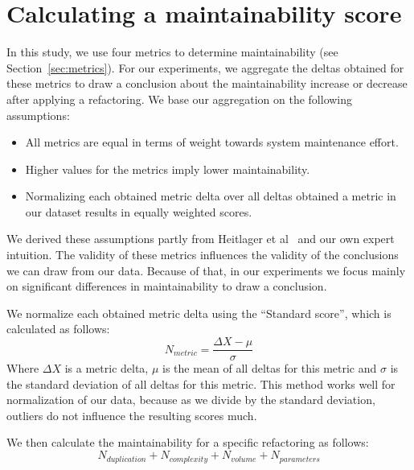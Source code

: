 \section{Calculating a maintainability score}\label{sec:metricformula}
In this study, we use four metrics to determine maintainability (see Section~\ref{sec:metrics}). For our experiments, we aggregate the deltas obtained for these metrics to draw a conclusion about the maintainability increase or decrease after applying a refactoring. We base our aggregation on the following assumptions:
\begin{itemize}
  \item All metrics are equal in terms of weight towards system maintenance effort.
  \item Higher values for the metrics imply lower maintainability. %
  \item Normalizing each obtained metric delta over all deltas obtained a metric in our dataset results in equally weighted scores. %
\end{itemize}
We derived these assumptions partly from Heitlager et al~\cite{heitlager2007practical} and our own expert intuition. The validity of these metrics influences the validity of the conclusions we can draw from our data. Because of that, in our experiments we focus mainly on significant differences in maintainability to draw a conclusion. %

We normalize each obtained metric delta using the ``Standard score'', which is calculated as follows:
\begin{equation}\label{eq:scoredev}
N_{metric} = \frac {\Delta X-\mu}{\sigma}
\end{equation}
Where $\Delta X$ is a metric delta, $\mu$ is the mean of all deltas for this metric and $\sigma$ is the standard deviation of all deltas for this metric. This method works well for normalization of our data, because as we divide by the standard deviation, outliers do not influence the resulting scores much.

We then calculate the maintainability for a specific refactoring as follows:
\begin{equation}\label{eq:scoreref}
N_{duplication} + N_{complexity} + N_{volume} + N_{parameters}
\end{equation}
